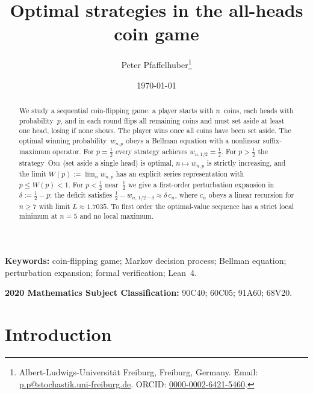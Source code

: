 \documentclass[12pt]{article}
\title{Optimal strategies in the all-heads coin game}
\author{Peter Pfaffelhuber\thanks{%
  Albert-Ludwigs-Universit\"at Freiburg, Freiburg, Germany.
  Email: \href{mailto:p.p@stochastik.uni-freiburg.de}{p.p@stochastik.uni-freiburg.de}.
  ORCID: \href{https://orcid.org/0000-0002-6421-5460}{0000-0002-6421-5460}.}}
\date{\today}
\theoremstyle{definition}
\theoremstyle{remark}
\newcommand{\One}{\textsc{One}}
\begin{document}
\maketitle

\begin{abstract}
  We study a sequential coin-flipping game: a player starts with
  $n$~coins, each heads with probability~$p$, and in each round flips
  all remaining coins and must set aside at least one head, losing if
  none shows.  The player wins once all coins have been set aside.
  The optimal winning probability~$w_{n,p}$ obeys a Bellman equation
  with a nonlinear suffix-maximum operator.  For $p=\tfrac12$ every
  strategy achieves $w_{n,1/2}=\tfrac12$.  For $p>\tfrac12$ the
  strategy~\One{} (set aside a single head) is optimal,
  $n\mapsto w_{n,p}$ is strictly increasing, and the limit
  $W(p):=\lim_n w_{n,p}$ has an explicit series representation with
  $p\le W(p)<1$.  For $p<\tfrac12$ near~$\tfrac12$ we give a
  first-order perturbation expansion in $\delta:=\tfrac12-p$: the
  deficit satisfies
  $\tfrac12-w_{n,\,1/2-\delta}\approx\delta\,c_n$, where $c_n$ obeys a
  linear recursion for $n\ge7$ with limit $L\approx1.7035$.  To first
  order the optimal-value sequence has a strict local minimum at
  $n=5$ and no local maximum.
\end{abstract}

\noindent\textbf{Keywords:} coin-flipping game; Markov decision
process; Bellman equation; perturbation expansion; formal
verification; Lean~4.

\noindent\textbf{2020 Mathematics Subject Classification:}
90C40; 60C05; 91A60; 68V20.

\section{Introduction}\label{sec:intro}
\end{document}
